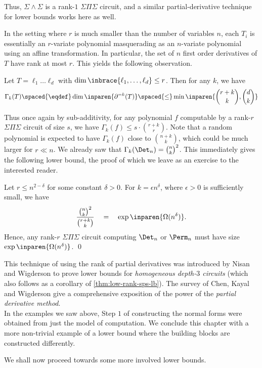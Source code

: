 Thus, $\Sigma\!\wedge\!\Sigma$  is a rank-$1$ $\Sigma\Pi\Sigma$ circuit, and a similar partial-derivative technique for lower bounds works here as well. 

In the setting where $r$ is much smaller than the number of variables $n$, each $T_i$ is essentially an $r$-variate polynomial masquerading as an $n$-variate polynomial using an affine transformation. 
In particular, the set of $n$ first order derivatives of $T$ have rank at most $r$. 
This yields the following observation.

\begin{observation}
Let $T = \ell_1\dots \ell_d$ with $\dim\inbrace{\ell_1,\dots, \ell_d}\leq r$. 
Then for any $k$, we have
$$
\Gamma_k(T) \spaced{\eqdef}\dim\inparen{\partial^{=k}(T)} \spaced{\leq} \min\inparen{\binom{r+k}{k}, \binom{d}{k}}
$$
\end{observation}

Thus once again by sub-additivity, for any polynomial $f$ computable by a rank-$r$ $\Sigma\Pi\Sigma$ circuit of size $s$, we have $\Gamma_k(f) \leq s\cdot \binom{r+k}{r}$. 
Note that a random polynomial is expected to have $\Gamma_k(f)$ close to $\binom{n+k}{k}$, which could be much larger for $r\ll n$. 
We already saw that $\Gamma_k(\Det_n) = \binom{n}{k}^2$. 
This immediately gives the following lower bound, the proof of which we leave as an exercise to the interested reader. 

\begin{theorem}\label{thm:low-rank-sps-lb}
Let $r \leq n^{2-\delta}$ for some constant $\delta > 0$. 
For $k = \epsilon n^{\delta}$, where $\epsilon > 0$ is sufficiently small, we have
$$
\frac{\binom{n}{k}^2}{\binom{r+k}{k}} \quad=\quad \exp\inparen{\Omega(n^{\delta})}.
$$
Hence, any rank-$r$ $\Sigma\Pi\Sigma$ circuit computing $\Det_n$ or $\Perm_n$ must have size $\exp\inparen{\Omega(n^\delta)}$. \qed
\end{theorem}


This technique of using the rank of partial derivatives was introduced by Nisan and Wigderson \cite{nw1997} to prove lower bounds for \emph{homogeneous depth-$3$ circuits} (which also follows as a corollary of \autoref{thm:low-rank-sps-lb}). 
The survey of Chen, Kayal and Wigderson \cite{ckw11} give a comprehensive exposition of the power of the \emph{partial derivative method}. \\

In the examples we saw above, Step $1$ of constructing the normal forms were obtained from just the model of computation. 
We conclude this chapter with a more non-trivial example of a lower bound where the building blocks are constructed differently. 

We shall now proceed towards some more involved lower bounds. 



